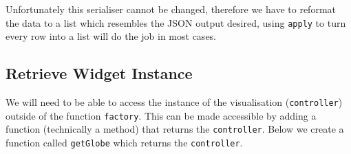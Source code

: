 \documentclass[10pt,]{krantz}
\makeatletter
\newenvironment{Shaded}{\begin{snugshade}}{\end{snugshade}}
\newcommand{\CommentTok}[1]{\textcolor[rgb]{0.37,0.37,0.37}{\textit{#1}}}
\newcommand{\ControlFlowTok}[1]{\textcolor[rgb]{0.27,0.27,0.27}{\textbf{#1}}}
\newcommand{\DataTypeTok}[1]{\textcolor[rgb]{0.27,0.27,0.27}{#1}}
\newcommand{\DecValTok}[1]{\textcolor[rgb]{0.06,0.06,0.06}{#1}}
\newcommand{\KeywordTok}[1]{\textcolor[rgb]{0.27,0.27,0.27}{\textbf{#1}}}
\newcommand{\NormalTok}[1]{#1}
\newcommand{\OperatorTok}[1]{\textcolor[rgb]{0.43,0.43,0.43}{\textbf{#1}}}
\newcommand{\StringTok}[1]{\textcolor[rgb]{0.5,0.5,0.5}{#1}}
\newenvironment{kframe}{%
\medskip{}
\setlength{\fboxsep}{.8em}
 \def\at@end@of@kframe{}%
 \ifinner\ifhmode%
  \def\at@end@of@kframe{\end{minipage}}%
  \begin{minipage}{\columnwidth}%
 \fi\fi%
 \def\FrameCommand##1{\hskip\@totalleftmargin \hskip-\fboxsep
 \colorbox{shadecolor}{##1}\hskip-\fboxsep
     \hskip-\linewidth \hskip-\@totalleftmargin \hskip\columnwidth}%
 \MakeFramed {\advance\hsize-\width
   \@totalleftmargin\z@ \linewidth\hsize
   \@setminipage}}%
 {\par\unskip\endMakeFramed%
 \at@end@of@kframe}
\renewenvironment{Shaded}{\begin{kframe}}{\end{kframe}}
\makeatother
\begin{document}
Unfortunately this serialiser cannot be changed, therefore we have to reformat the data to a list which resembles the JSON output desired, using \texttt{apply} to turn every row into a list will do the job in most cases.

\begin{Shaded}
\end{Shaded}

\hypertarget{shiny-widgets-retrieve}{%
\subsection{Retrieve Widget Instance}\label{shiny-widgets-retrieve}}

We will need to be able to access the instance of the visualisation (\texttt{controller}) outside of the function \texttt{factory}. This can be made accessible by adding a function (technically a method) that returns the \texttt{controller}. Below we create a function called \texttt{getGlobe} which returns the \texttt{controller}.
\end{document}
